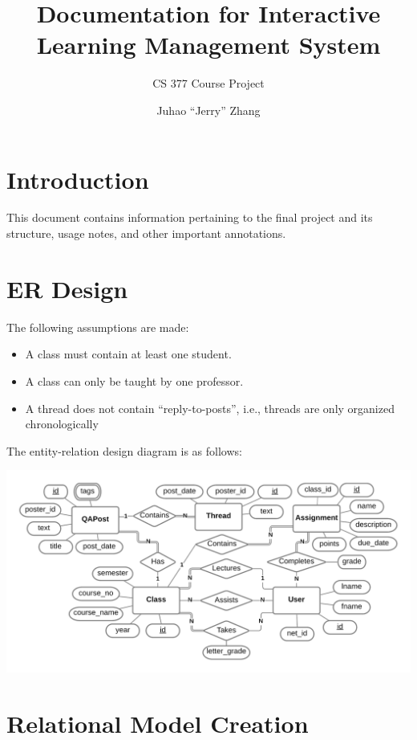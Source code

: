 \documentclass{paper}
\title{Documentation for Interactive Learning Management System}
\subtitle{CS 377 Course Project}
\author{Juhao ``Jerry'' Zhang}
\begin{document}
	
	\maketitle
	
	\tableofcontents
	
	\section{Introduction}
	
	This document contains information pertaining to the final project and its structure, usage notes, and other important annotations.
	
	\section{ER Design}
	
	The following assumptions are made:
	\begin{itemize}
		\item A class must contain at least one student.
		\item A class can only be taught by one professor.
		\item A thread does not contain ``reply-to-posts'', i.e., threads are only organized chronologically
	\end{itemize}
	The entity-relation design diagram is as follows:
	\begin{center}
		\includegraphics[scale=0.131]{er_diagram.png}
	\end{center}
	
	\section{Relational Model Creation}
	
\end{document}
